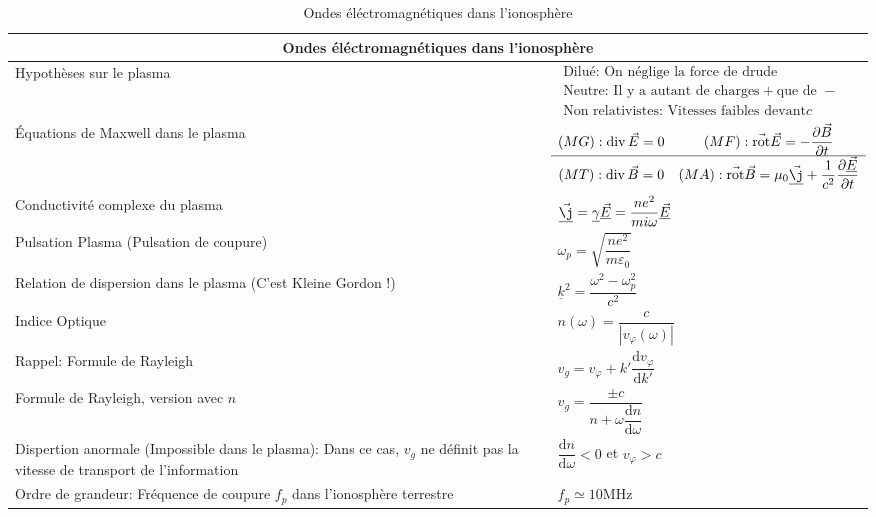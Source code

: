 \documentclass[10pt,a4paper,titlepage,landscape]{article}
\renewcommand{\d}
{
    \mathrm{d}
}
\newcommand*{\dv}[2]
{
    \dfrac{\d#1}{\d#2}
}
\newcommand*{\dpv}[2]
{
    \dfrac{\partial#1}{\partial#2}
}
\newcommand{\rot}
{
    \vec{\operatorname{rot}}
}
\renewcommand{\div}
{
    \operatorname{div}
}
\renewcommand{\arraystretch}{2}
\begin{document}
\begin{table}[H]
    \centering
    \renewcommand{\arraystretch}{1.5} %
    \setlength{\tabcolsep}{8pt} %
    \begin{tabular}{@{}|p{9cm}|p{10cm}@{}|}

        \multicolumn{2}{c}{\textbf{Ondes éléctromagnétiques dans l'ionosphère}} \\ \hline

        Hypothèses sur le plasma & $\begin{array}{l}\text{Dilué: On néglige la force de drude} \\ \hline \text{Neutre: Il y a autant de charges} + \text{que de } - \\ \hline \text{Non relativistes: Vitesses faibles devant} c\end{array}$ \\ \hline
        Équations de Maxwell dans le plasma & $\begin{matrix}(MG): \div \vec{E} = 0 & (MF): \rot\vec{E} = -\dpv{\vec{B}}{t} \\ \hline (MT): \div \vec{B} = 0 & (MA): \rot \vec{B} = \mu_0 \underline {\vec \j} + \dfrac{1}{c^2}\dpv{\underline {\vec E}}{t}\end{matrix}$ \\ \hline
        Conductivité complexe du plasma & $\underline {\vec \j} = \underline \gamma \underline {\vec E}  = \dfrac{ne^2}{mi\omega} \underline {\vec E}$ \\ \hline
        Pulsation Plasma (Pulsation de coupure) & $\omega_p = \sqrt{\dfrac{ne^2}{m\varepsilon_0}}$ \\ \hline
        Relation de dispersion dans le plasma (C'est Kleine Gordon !)& $\underline k ^2 = \dfrac{\omega^2 - \omega_p^2}{c^2}$ \\ \hline
        Indice Optique & $n(\omega) = \dfrac{c}{|v_{\varphi}(\omega)|}$ \\ \hline
        Rappel: Formule de Rayleigh & $v_g = v_{\varphi} + k'\dv{v_{\varphi}}{k'}$ \\ \hline
        Formule de Rayleigh, version avec $n$ & $v_g = \dfrac{\pm c}{n+\omega\dv{n}{\omega}}$ \\ \hline 
        Dispertion anormale (Impossible dans le plasma): Dans ce cas, $v_g$ ne définit pas la vitesse de transport de l'information & $\dv{n}{\omega} < 0$ et $v_{\varphi} > c$\\ \hline
        Ordre de grandeur: Fréquence de coupure $f_p$ dans l'ionosphère terrestre & $f_p \simeq \num{10}\unit{\MHz}$ \\ \hline
    \end{tabular}
\caption{Ondes éléctromagnétiques dans l'ionosphère}
\label{tab:ohm_iono}
\end{table}
\end{document}
